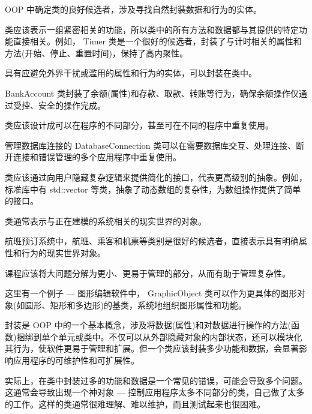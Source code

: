 
OOP 中确定类的良好候选者，涉及寻找自然封装数据和行为的实体。


类应该表示一组紧密相关的功能，所以类中的所有方法和数据都与其提供的特定功能直接相关。例如， Timer 类是一个很好的候选者，封装了与计时相关的属性和方法(开始、停止、重置时间)，保持了高内聚性。


具有应避免外界干扰或滥用的属性和行为的实体，可以封装在类中。

BankAccount 类封装了余额(属性)和存款、取款、转账等行为，确保余额操作仅通过受控、安全的操作完成。


类应该设计成可以在程序的不同部分，甚至可在不同的程序中重复使用。

管理数据库连接的 DatabaseConnection 类可以在需要数据库交互、处理连接、断开连接和错误管理的多个应用程序中重复使用。


类应该通过向用户隐藏复杂逻辑来提供简化的接口，代表更高级别的抽象。例如，标准库中有 std::vector 等类，抽象了动态数组的复杂性，为数组操作提供了简单的接口。


类通常表示与正在建模的系统相关的现实世界的对象。

航班预订系统中，航班、乘客和机票等类别是很好的候选者，直接表示具有明确属性和行为的现实世界对象。


课程应该将大问题分解为更小、更易于管理的部分，从而有助于管理复杂性。

这里有一个例子 --- 图形编辑软件中， GraphicObject 类可以作为更具体的图形对象(如圆形、矩形和多边形)的基类，系统地组织图形属性和功能。


封装是 OOP 中的一个基本概念，涉及将数据(属性)和对数据进行操作的方法(函数)捆绑到单个单元或类中。不仅可以从外部隐藏对象的内部状态，还可以模块化其行为，使软件更易于管理和扩展。但一个类应该封装多少功能和数据，会显著影响应用程序的可维护性和可扩展性。


实际上，在类中封装过多的功能和数据是一个常见的错误，可能会导致多个问题。这通常会导致出现一个神对象 --- 控制应用程序太多不同部分的类，自己做了太多的工作。这样的类通常很难理解、难以维护，而且测试起来也很困难。

